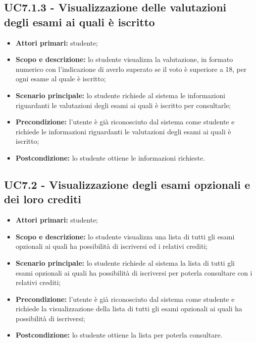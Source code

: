 \documentclass[AnalisiDeiRequisiti.tex]{subfiles}
\begin{document}
\subsection{UC7.1.3 - Visualizzazione delle valutazioni degli esami ai quali è iscritto}
\begin{itemize}
	\item \textbf{Attori primari:} studente;\\
	\item \textbf{Scopo e descrizione:} lo studente visualizza la valutazione, in formato numerico con l'indicazione di averlo superato se il voto è superiore a 18, per ogni esame al quale è iscritto;\\
	\item \textbf{Scenario principale:} lo studente richiede al sistema le informazioni riguardanti le valutazioni degli esami ai quali è iscritto per consultarle;\\
	\item \textbf{Precondizione:} l'utente è già riconosciuto dal sistema come studente e richiede le informazioni riguardanti le valutazioni degli esami ai quali è iscritto;\\
	\item \textbf{Postcondizione:} lo studente ottiene le informazioni richieste.\\
\end{itemize}

\subsection{UC7.2 - Visualizzazione degli esami opzionali e dei loro crediti}
\begin{itemize}
	\item \textbf{Attori primari:} studente;\\
	\item \textbf{Scopo e descrizione:} lo studente visualizza una lista di tutti gli esami opzionali ai quali ha possibilità di iscriversi ed i relativi crediti;\\
	\item \textbf{Scenario principale:} lo studente richiede al sistema la lista di tutti gli esami opzionali ai quali ha possibilità di iscriversi per poterla consultare con i relativi crediti;\\
	\item \textbf{Precondizione:} l'utente è già riconosciuto dal sistema come studente e richiede la visualizzazione della lista di tutti gli esami opzionali ai quali ha possibilità di iscriversi;\\
	\item \textbf{Postcondizione:} lo studente ottiene la lista per poterla consultare.\\
\end{itemize}
\end{document}

